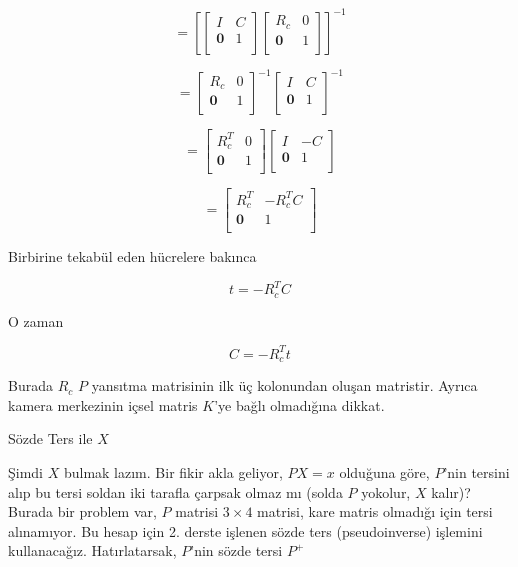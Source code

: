 \documentclass[12pt,fleqn]{article}\usepackage{../../common}
\begin{document}
$$ 
= \left[ 
\left[ \begin{array}{c|c} I & C \\ 
  \hline \boldsymbol{0} & 1 \\ 
  \end{array}
\right]
\left[ \begin{array}{c|c} R_c & 0 \\ 
  \hline \boldsymbol{0} & 1 \\ 
  \end{array}
\right]
\right]^{-1}
$$

$$ 
= \left[
  \begin{array}{c|c} R_c & 0 \\ 
  \hline \boldsymbol{0} & 1 \\ 
   \end{array} 
  \right]^{-1} 
\left[ \begin{array}{c|c} I & C \\ 
  \hline \boldsymbol{0} & 1 \\ 
   \end{array}
\right]^{-1}
$$

$$ 
= \left[\begin{array}{c|c} R_c^T & 0 \\ 
\hline \boldsymbol{0} & 1 \\ 
\end{array}
\right]
\left[ \begin{array}{c|c} I & -C \\ 
\hline \boldsymbol{0} & 1 \\ 
\end{array}
\right]
$$

$$ 
= \left[\begin{array}{c|c} R_c^T & -R_c^TC \\ 
\hline \boldsymbol{0} & 1 \\ 
\end{array}
\right]
$$

Birbirine tekabül eden hücrelere bakınca 

$$ t = -R_c^TC$$

O zaman 

$$ C = -R_c^T t$$

Burada $R_c$ $P$ yansıtma matrisinin ilk üç kolonundan oluşan
matristir. Ayrıca kamera merkezinin içsel matris $K$'ye bağlı olmadığına
dikkat. 

Sözde Ters ile $X$

Şimdi $X$ bulmak lazım. Bir fikir akla geliyor, $PX = x$ olduğuna göre,
$P$'nin tersini alıp bu tersi soldan iki tarafla çarpsak olmaz mı (solda
$P$ yokolur, $X$ kalır)? Burada bir problem var, $P$ matrisi $3 \times 4$
matrisi, kare matris olmadığı için tersi alınamıyor. Bu hesap için
2. derste işlenen sözde ters (pseudoinverse) işlemini
kullanacağız. Hatırlatarsak, $P$'nin sözde tersi $P^{+}$
\end{document}
